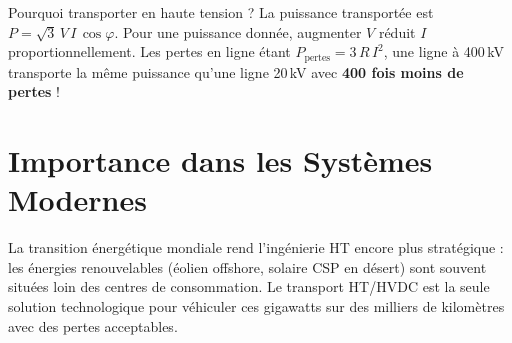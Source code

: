 \documentclass[12pt, a4paper, twoside]{report}
\begin{document}
\begin{retenir}{Pourquoi transporter en haute tension ?}
La puissance transportée est $P = \sqrt{3}\,V\,I\,\cos\varphi$.
Pour une puissance donnée, augmenter $V$ réduit $I$ proportionnellement.
Les pertes en ligne étant $P_{\text{pertes}} = 3\,R\,I^2$, une ligne à 400\,kV
transporte la même puissance qu'une ligne 20\,kV avec \textbf{400 fois moins de pertes} !
\end{retenir}

\section{Importance dans les Systèmes Modernes}

La transition énergétique mondiale rend l'ingénierie HT encore plus stratégique :
les énergies renouvelables (éolien offshore, solaire CSP en désert) sont souvent situées
loin des centres de consommation. Le transport HT/HVDC est la seule solution technologique
pour véhiculer ces gigawatts sur des milliers de kilomètres avec des pertes acceptables.
\end{document}
